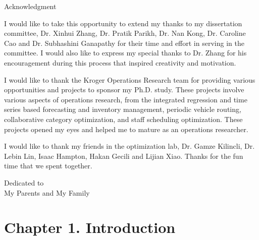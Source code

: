 \documentclass[12pt,english]{report}
\begin{document}
\begin{doublespace}
    \tableofcontents
    \listoffigures
    \listoftables
\end{doublespace}
%
\newpage
\thispagestyle{plain}
\setlength{\parindent}{0em}
\begin{center}
    {\huge Acknowledgment}
\end{center}

\setlength{\parindent}{2em}

I would like to take this opportunity to extend my thanks to my dissertation committee,  Dr. Xinhui Zhang, Dr. Pratik Parikh, Dr. Nan Kong, Dr. Caroline Cao and Dr. Subhashini Ganapathy for their time and effort in serving in the committee.  I would also like to express my special thanks to Dr. Zhang for his encouragement during this process that inspired creativity and motivation.

I would like to thank the Kroger Operations Research team for providing various opportunities and projects to sponsor my Ph.D. study.  These projects involve various aspects of operations research, from the integrated regression and time series based forecasting and inventory management, periodic vehicle routing, collaborative category optimization, and staff scheduling optimization.  These projects opened my eyes and helped me to mature as an operations researcher.

I would like to thank my friends in the optimization lab,  Dr. Gamze Kilincli, Dr. Lebin Lin, Isaac Hampton, Hakan Gecili and Lijian Xiao. Thanks for the fun time that we spent together.

%
\newpage
\thispagestyle{plain}
\vspace*{3in}
\begin{center}
    Dedicated to\\
    My Parents and My Family
\end{center}
%
%
%

\newpage
\setcounter{page}{1}
\setlength{\parindent}{2em}
\chapter{Chapter 1. Introduction}
\end{document}
